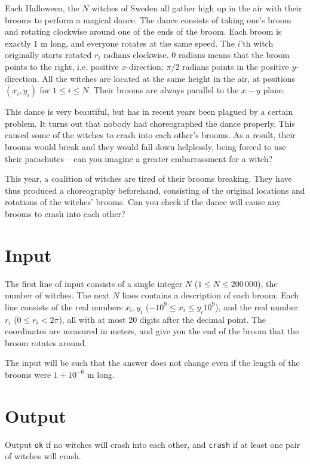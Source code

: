 Each Halloween, the $N$ witches of Sweden all gather high up in the air with their brooms to perform a magical dance.
The dance consists of taking one's broom and rotating clockwise around one of the ends of the broom.
Each broom is exactly $1\text{ m}$ long, and everyone rotates at the same speed.
The $i$'th witch originally starts rotated $r_i\text{ radians}$ clockwise.
$0$ radians means that the broom points to the right, i.e. positive $x$-direction; $\pi/2$ radians points in the positive $y$-direction.
All the witches are located at the same height in the air, at positions $(x_i, y_i)$ for $1 \le i \le N$. Their brooms are always parallel to the $x-y$ plane.

This dance is very beautiful, but has in recent years been plagued by a certain problem.
It turns out that nobody had choreographed the dance properly.
This caused some of the witches to crash into each other's brooms.
As a result, their brooms would break and they would fall down helplessly, being forced to use their parachutes -- can you imagine a greater embarrassment for a witch?

This year, a coalition of witches are tired of their brooms breaking.
They have thus produced a choreography beforehand, consisting of the original locations and rotations of the witches' brooms.
Can you check if the dance will cause any brooms to crash into each other?

\section*{Input}
The first line of input consists of a single integer $N$ ($1 \le N \le 200\,000$), the number of witches.
The next $N$ lines contains a description of each broom.
Each line consists of the real numbers $x_i, y_i$ ($-10^{9} \le x_i \le y_i 10^{9}$), and the real number $r_i$ ($0 \le r_i < 2\pi$), all with at most $20$ digits after the decimal point.
The coordinates are measured in meters, and give you the end of the broom that the broom rotates around.

The input will be such that the answer does not change even if the length of the brooms were $1 + 10^{-6}\text{ m}$ long.

\section*{Output}
Output \texttt{ok} if no witches will crash into each other, and \texttt{crash} if at least one pair of witches will crash.
